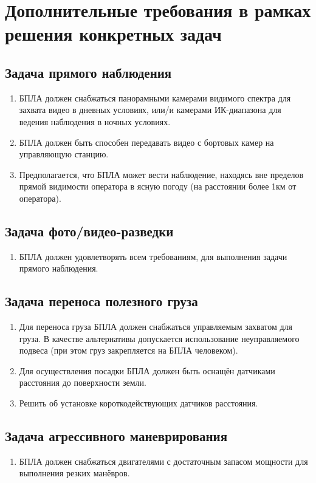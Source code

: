 \documentclass[utf8]{report}
\begin{document}
\section{Дополнительные требования в рамках решения конкретных задач}

\subsection{Задача прямого наблюдения}
\begin{enumerate}
  \item БПЛА должен снабжаться панорамными камерами видимого спектра для захвата видео в дневных условиях, или/и камерами ИК-диапазона для ведения наблюдения в ночных условиях.
  \item БПЛА должен быть способен передавать видео с бортовых камер на управляющую станцию.
  \item Предполагается, что БПЛА может вести наблюдение, находясь вне пределов прямой видимости оператора в ясную погоду (на расстоянии более 1км от оператора).
\end{enumerate}

\subsection{Задача фото/видео-разведки}
\begin{enumerate}
  \item БПЛА должен удовлетворять всем требованиям, для выполнения задачи прямого наблюдения.
\end{enumerate}

\subsection{Задача переноса полезного груза}
\begin{enumerate}
  \item Для переноса груза БПЛА должен снабжаться управляемым захватом для груза. В качестве альтернативы допускается использование неуправляемого подвеса (при этом груз закрепляется на БПЛА человеком).
  \item Для осуществления посадки БПЛА должен быть оснащён датчиками расстояния до поверхности земли.
  \item Решить об установке короткодействующих датчиков расстояния.
\end{enumerate}

\subsection{Задача агрессивного маневрирования}
\begin{enumerate}
  \item БПЛА должен снабжаться двигателями с достаточным запасом мощности для выполнения резких манёвров.
\end{enumerate}
\end{document}
